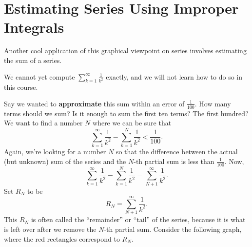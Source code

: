 \documentclass{ximera}
\begin{document}
\section{Estimating Series Using Improper Integrals}

Another cool application of this graphical viewpoint on series
involves estimating the sum of a series.

We cannot yet compute $\sum_{k=1}^\infty \frac{1}{k^2}$ exactly, and
we will not learn how to do so in this course. 

Say we wanted to \textbf{approximate} this sum within an error of
$\frac{1}{100}$.  How many terms should we sum?  Is it enough to sum
the first ten terms?  The first hundred?  We want to find a number $N$
where we can be sure that
\[
\sum_{k=1}^\infty \frac{1}{k^2}-\sum_{k=1}^N \frac{1}{k^2} < \frac{1}{100}.
\]
Again, we're looking for a number $N$ so that the difference between the actual 
(but unknown) sum of the series and the $N$-th partial sum is less than $\frac{1}{100}$. 
Now,
\[
\sum_{k=1}^\infty \frac{1}{k^2}- \sum_{k=1}^N \frac{1}{k^2} = \sum_{N+1}^\infty \frac{1}{k^2}.
\]
Set $R_N$ to be 
\[
R_N = \sum_{N+1}^\infty \frac{1}{k^2}.
\]
This $R_N$ is often called the ``remainder'' or ``tail'' of the series, because it is what is 
left over after we remove the $N$-th partial sum.  Consider the following graph, where the red 
rectangles correspond to $R_N$.
\end{document}
